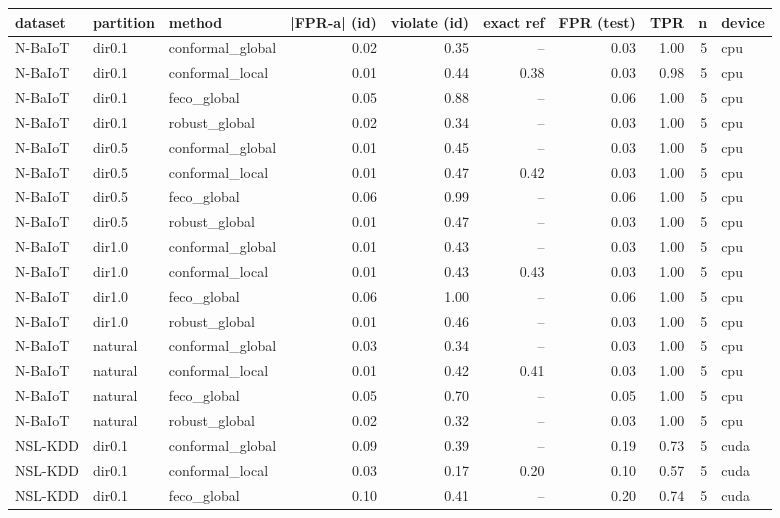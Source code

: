 \begin{tabular}{lllrrrrrrl}
\toprule
dataset & partition & method & |FPR-a| (id) & violate (id) & exact ref & FPR (test) & TPR & n & device \\
\midrule
N-BaIoT & dir0.1 & conformal\_global & 0.02 & 0.35 & -- & 0.03 & 1.00 & 5 & cpu \\
N-BaIoT & dir0.1 & conformal\_local & 0.01 & 0.44 & 0.38 & 0.03 & 0.98 & 5 & cpu \\
N-BaIoT & dir0.1 & feco\_global & 0.05 & 0.88 & -- & 0.06 & 1.00 & 5 & cpu \\
N-BaIoT & dir0.1 & robust\_global & 0.02 & 0.34 & -- & 0.03 & 1.00 & 5 & cpu \\
N-BaIoT & dir0.5 & conformal\_global & 0.01 & 0.45 & -- & 0.03 & 1.00 & 5 & cpu \\
N-BaIoT & dir0.5 & conformal\_local & 0.01 & 0.47 & 0.42 & 0.03 & 1.00 & 5 & cpu \\
N-BaIoT & dir0.5 & feco\_global & 0.06 & 0.99 & -- & 0.06 & 1.00 & 5 & cpu \\
N-BaIoT & dir0.5 & robust\_global & 0.01 & 0.47 & -- & 0.03 & 1.00 & 5 & cpu \\
N-BaIoT & dir1.0 & conformal\_global & 0.01 & 0.43 & -- & 0.03 & 1.00 & 5 & cpu \\
N-BaIoT & dir1.0 & conformal\_local & 0.01 & 0.43 & 0.43 & 0.03 & 1.00 & 5 & cpu \\
N-BaIoT & dir1.0 & feco\_global & 0.06 & 1.00 & -- & 0.06 & 1.00 & 5 & cpu \\
N-BaIoT & dir1.0 & robust\_global & 0.01 & 0.46 & -- & 0.03 & 1.00 & 5 & cpu \\
N-BaIoT & natural & conformal\_global & 0.03 & 0.34 & -- & 0.03 & 1.00 & 5 & cpu \\
N-BaIoT & natural & conformal\_local & 0.01 & 0.42 & 0.41 & 0.03 & 1.00 & 5 & cpu \\
N-BaIoT & natural & feco\_global & 0.05 & 0.70 & -- & 0.05 & 1.00 & 5 & cpu \\
N-BaIoT & natural & robust\_global & 0.02 & 0.32 & -- & 0.03 & 1.00 & 5 & cpu \\
NSL-KDD & dir0.1 & conformal\_global & 0.09 & 0.39 & -- & 0.19 & 0.73 & 5 & cuda \\
NSL-KDD & dir0.1 & conformal\_local & 0.03 & 0.17 & 0.20 & 0.10 & 0.57 & 5 & cuda \\
NSL-KDD & dir0.1 & feco\_global & 0.10 & 0.41 & -- & 0.20 & 0.74 & 5 & cuda \\

\end{tabular}
